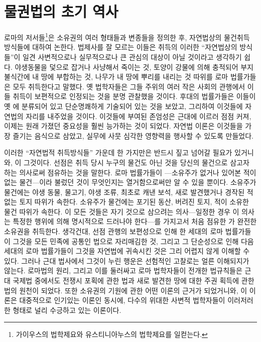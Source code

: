 \chapter{물권법의 초기 역사}

로마의  저서들\footnote{%
  가이우스의 법학제요와 유스티니아누스의 법학제요를 일컫는다.
}은
소유권의 여러 형태들과 변종들을 정의한 후,
자연법상의 물건취득 방식들에 대하여 논한다.
법제사를 잘 모르는 이들은
취득의 이러한 ``자연법상의 방식들''이
일견
사변적으로나 실무적으로나 큰 관심의 대상이 아닐 것이라고
생각하기 쉽다.
야생동물을 덫으로 잡거나 사냥해서 죽이는 것,
토양이 강물에 의해 충적되어 부지불식간에
내 땅에 부합하는 것,
나무가 내 땅에 뿌리를 내리는 것 따위를
로마 법률가들은 모두  취득한다고 말했다.
옛 법학자들은
그들 주위의 여러 작은 사회의 관행에서
이들 취득이
보편적으로 인정되는 것을 분명 관찰했을 것이다.
후대의 법률가들은
이들이 옛 에 분류되어 있고
단순명쾌하게 기술되어 있는 것을 보았고, 그리하여
이것들에
자연법의 자리를
내주었을 것이다.
이것들에 부여된 존엄성은 근대에 이르러 점점 커져,
이제는 원래 가졌던 중요성을 훨씬 능가하는 것이 되었다.
자연법 이론은 이것들을 가장 즐기는 음식으로 삼았고,
실무에 사뭇 심각한 영향력을 행사할 수 있도록 만들었다.

이러한 ``자연법적 취득방식들'' 가운데
한 가지만은 반드시 짚고 넘어갈 필요가 있거니와,
이 그것이다.
선점은
취득 당시 누구의 물건도 아닌 것을
당신의 물건으로 삼고자 하는 의사로써
점유하는 것을 말한다.
로마 법률가들이 ---소유주가
없거나 있어본 적이 없는 물건---이라 불렀던
것이 무엇인지는 열거함으로써만 알 수 있을 뿐이다.
소유주가  물건에는
야생 동물, 물고기, 야생 조류, 최초로 캐낸 보석,
새로 발견했거나 경작된 적 없는 토지 따위가 속한다.
소유주가  물건에는
포기된 동산, 버려진 토지,
적이 소유한 물건 따위가 속한다.
이 모든 것들은
자기 것으로 삼으려는 의사---일정한 경우 이 의사는
특정한 행위에 의해 명시적으로 드러나야 한다---를 가지고서 처음 점유한
가 완전한 소유권을 취득한다.
생각건대,
선점 관행의 보편성으로 인해
한 세대의 로마 법률가들이 그것을 모든 민족에 공통인 법으로
자리매김한 것,
그리고 그 단순성으로 인해
다음 세대의 로마 법률가들이 그것을 자연법에 귀속시킨 것은
그리 어렵지 않게 이해할 수 있다.
그러나 근대 법사에서 그것이 누린 행운은
선험적인 고찰로는 얼른 이해되지가 않는다.
로마법의  원리, 그리고 이를 둘러싸고 로마 법학자들이 전개한 법규칙들은
근대 국제법 중에서도
전쟁시 포획에 관한 법과
새로 발견한 땅에 대한 주권 획득에 관한 법의
원천이 되었다.
또한 소유권의 기원에 관한 어떤 이론의 근거가 되었거니와,
이 이론은 대중적으로 인기있는 이론인 동시에,
다수의 위대한 사변적 법학자들이
이러저러한 형태로
널리 수긍하고 있는 이론이다.


